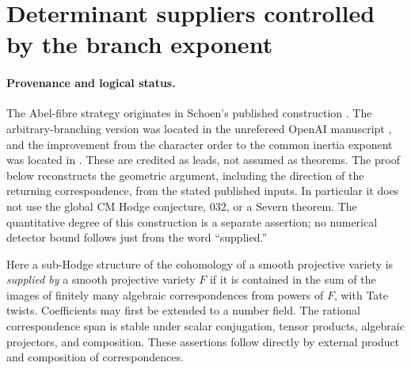 \section{Determinant suppliers controlled by the branch exponent}
\label{sec:branch-exponent}

\paragraph{Provenance and logical status.}
The Abel-fibre strategy originates in Schoen's published construction
\cite[\S2, pp.~12--17]{G34:Schoen}.  The arbitrary-branching version was
located in the unrefereed OpenAI manuscript \cite[Lemma~3.4]{Root:Gale},
and the improvement from the character order to the common inertia
exponent was located in \cite[\S2]{Root:Rstation66}.  These are credited
as leads, not assumed as theorems.  The proof below reconstructs the
geometric argument, including the direction of the returning
correspondence, from the stated published inputs.  In particular it
does not use the global CM Hodge conjecture, 032, or a Severn theorem.
The quantitative degree of this construction is a separate assertion;
no numerical detector bound follows just from the word ``supplied.''

Here a sub-Hodge structure of the cohomology of a smooth projective
variety is \emph{supplied by} a smooth projective variety $F$ if it is
contained in the sum of the images of finitely many algebraic
correspondences from powers of $F$, with Tate twists.  Coefficients may
first be extended to a number field.  The rational correspondence span
is stable under scalar conjugation, tensor products, algebraic
projectors, and composition.  These assertions follow directly by
external product and composition of correspondences.

